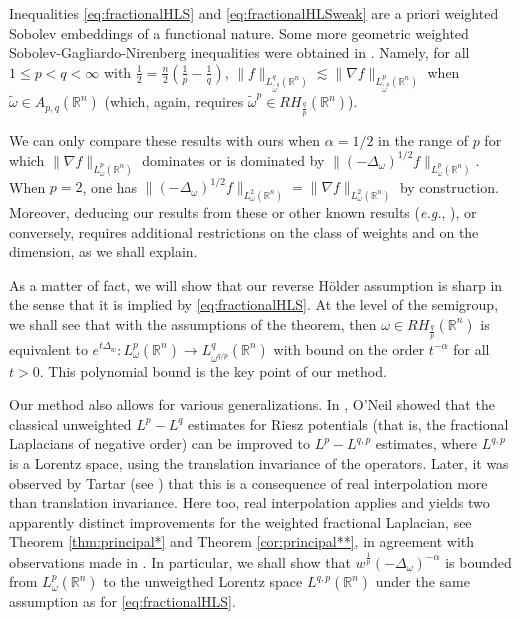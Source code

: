 \documentclass[12pt, letterpaper]{amsart}
\theoremstyle{definition}
\theoremstyle{remark}
\numberwithin{equation}{section}
\begin{document}
Inequalities \eqref{eq:fractionalHLS} and \eqref{eq:fractionalHLSweak} are  a priori weighted Sobolev embeddings of a functional nature. Some more geometric weighted Sobolev-Gagliardo-Nirenberg inequalities were obtained in  \cite{lacey2010sharp}. Namely,   for all $1\le p<q<\infty$ with $\frac 1 2 =\frac{n}{2}(\frac{1}{p}-\frac{1}{q})$, $\| f \|_{L^q_{{\tilde\omega}^{q}}(\mathbb{R}^n)} \lesssim \| \nabla f \|_{L^p_{\tilde\omega^p}(\mathbb{R}^n)}$ when $\tilde\omega \in A_{p,q}(\mathbb{R}^n)$ (which, again, requires $\tilde\omega^p \in RH_{\frac{q}{p}}(\mathbb{R}^n)$). 

We can only compare these results with ours  when $\alpha=1/2$ in the range of $p$ for which $ \| \nabla f \|_{L^p_{\omega}(\mathbb{R}^n)} $ dominates or is dominated by $ \| (-\Delta_\omega)^{1/2} f \|_{L^p_{\omega}(\mathbb{R}^n)}$. When $p=2$, one has $\| (-\Delta_\omega)^{1/2} f \|_{L^2_{\omega}(\mathbb{R}^n)}= \| \nabla f \|_{L^2_{\omega}(\mathbb{R}^n)}$ by construction. Moreover, deducing our results from these or other known results (\textit{e.g.}, \cite{muckenhoupt1974weighted}), or conversely,  requires additional restrictions on the class of weights and on the dimension, as we shall explain.


As a matter of fact, we will show that our reverse H\"older assumption is sharp in the sense that it is implied by \eqref{eq:fractionalHLS}. At the level of the semigroup, we shall see that with the assumptions of the theorem, then $\omega \in RH_{\frac{q}{p}}(\mathbb{R}^n)$ is equivalent to  $e^{t\Delta_w}:  L^p_{\omega}(\mathbb{R}^n) \to L^q_{{\omega}^{q/p}}(\mathbb{R}^n)$
with bound on the order $t^{-\alpha}$ for all $t>0$. This polynomial bound is the key point of our method. 






Our method also allows for various generalizations. In \cite{O'Neil1963convolution}, O'Neil showed that the classical unweighted $L^p-L^q$ estimates for Riesz potentials (that is, the fractional Laplacians of negative order) can be improved to $L^p-L^{q,p}$ estimates, where $L^{q,p}$ is a Lorentz space, using the translation invariance of the operators. Later, it was observed by Tartar (see \cite{MR1662313}) that this is a consequence of real interpolation more than translation invariance.  Here too, real interpolation applies and yields two  apparently distinct improvements for the weighted fractional Laplacian, see Theorem \ref{thm:principal*} and Theorem \ref{cor:principal**}, in agreement with observations made in \cite{MR4440073}. In particular, we shall show that $w^{\frac 1 p}(-\Delta_\omega)^{-\alpha}$ is bounded from $L^p_{\omega}(\mathbb{R}^n)$ to the unweigthed Lorentz space $L^{q,p}(\mathbb{R}^n)$ under the same assumption as for \eqref{eq:fractionalHLS}.
\end{document}
